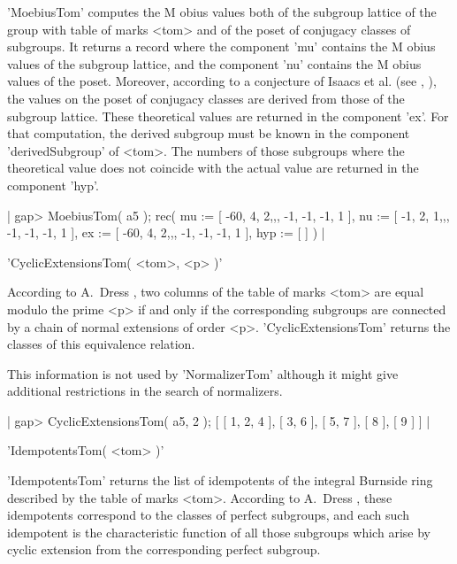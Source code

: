'MoebiusTom' computes the M{ o}bius values both of the subgroup
lattice of  the  group with table of  marks  <tom>  and of  the  poset of
conjugacy classes of  subgroups.  It returns a record where the component
'mu' contains the M{ o}bius values of the subgroup lattice, and
the component 'nu' contains the M{  o}bius values of the poset.
Moreover, according to  a conjecture  of Isaacs et al. (see \cite{HIO89},
\cite{Pah93}), the  values  on the poset of conjugacy classes are derived
from  those  of  the subgroup  lattice.   These  theoretical  values  are
returned  in  the  component 'ex'.  For  that  computation,  the  derived
subgroup  must be known in the component 'derivedSubgroup' of <tom>.  The
numbers  of those subgroups where the theoretical value does not coincide
with the actual value are returned in the component 'hyp'.

|    gap> MoebiusTom( a5 );
    rec(
      mu := [ -60, 4, 2,,, -1, -1, -1, 1 ],
      nu := [ -1, 2, 1,,, -1, -1, -1, 1 ],
      ex := [ -60, 4, 2,,, -1, -1, -1, 1 ],
      hyp := [  ] ) |


'CyclicExtensionsTom( <tom>, <p> )'

According  to  A.~Dress  \cite{Dre69}, two columns of the table  of marks
<tom>  are equal modulo the prime <p> if  and only  if  the corresponding
subgroups are connected  by a chain  of normal extensions  of order  <p>.
'CyclicExtensionsTom' returns the classes of this equivalence relation.

This  information is  not used by  'NormalizerTom' although it might give
additional restrictions in the search of normalizers.

|    gap> CyclicExtensionsTom( a5, 2 );
    [ [ 1, 2, 4 ], [ 3, 6 ], [ 5, 7 ], [ 8 ], [ 9 ] ] |


'IdempotentsTom( <tom> )'

'IdempotentsTom' returns the list of idempotents of the integral Burnside
ring  described  by  the  table  of marks <tom>.   According  to A.~Dress
\cite{Dre69},  these  idempotents  correspond to the  classes of  perfect
subgroups, and each such idempotent is the characteristic function of all
those  subgroups which arise by cyclic  extension from  the corresponding
perfect subgroup.

